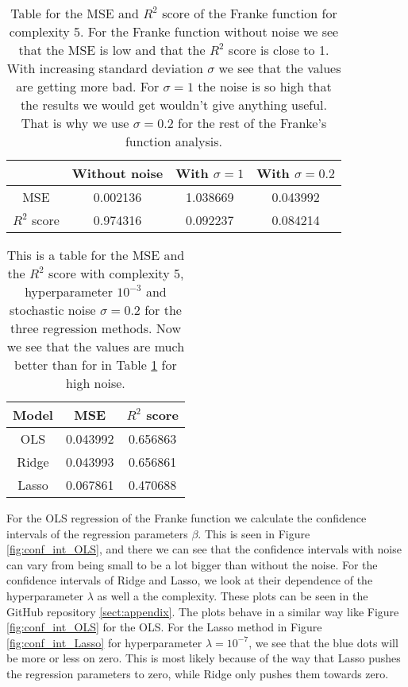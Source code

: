 \documentclass[12pt,a4paper,english]{article}
\begin{document}
\begin{table}[h!]
	\centering
	\begin{tabular}{ |c|c|c|c| }
		\hline \rule{0pt}{13pt}
		 & Without noise & With $\sigma=1$ & With $\sigma=0.2$ \\
		\hline \rule{0pt}{13pt}
		MSE & 0.002136 & 1.038669 & 0.043992 \\
		\hline \rule{0pt}{13pt}
		$R^2$ score & 0.974316 & 0.092237 & 0.084214 \\
		\hline
	\end{tabular}	
	\caption{Table for the MSE and $R^2$ score of the Franke function for complexity 5. For the Franke function without noise we see that the MSE is low and that the $R^2$ score is close to 1. With increasing standard deviation $\sigma$ we see that the values are getting more bad. For $\sigma=1$ the noise is so high that the results we would get wouldn't give anything useful. That is why we use $\sigma=0.2$ for the rest of the Franke's function analysis.}
	\label{tab:high_noise}
\end{table}

\begin{table}[h!]
	\centering
	\begin{tabular}{ |c|c|c| }
		\hline \rule{0pt}{13pt}
		Model& MSE & $R^2$ score \\
		\hline \rule{0pt}{13pt}
		OLS & 0.043992 & 0.656863 \\
		\hline \rule{0pt}{13pt}
		Ridge & 0.043993 & 0.656861 \\
		\hline \rule{0pt}{13pt}
		Lasso & 0.067861 & 0.470688 \\
		\hline
	\end{tabular}	
	\caption{This is a table for the MSE and the $R^2$ score with complexity 5, hyperparameter $10^{-3}$ and stochastic noise $\sigma=0.2$ for the three regression methods. Now we see that the values are much better than for in Table \ref{tab:high_noise} for high noise.}
	\label{tab:low_noise}
\end{table}

For the OLS regression of the Franke function we calculate the confidence intervals of the regression parameters $\beta$. This is seen in Figure \ref{fig:conf_int_OLS}, and there we can see that the confidence intervals with noise can vary from being small to be a lot bigger than without the noise. For the confidence intervals of Ridge and Lasso, we look at their dependence of the hyperparameter $\lambda$ as well a the complexity. These plots can be seen in the GitHub repository \ref{sect:appendix}. The plots behave in a similar way like Figure \ref{fig:conf_int_OLS} for the OLS. For the Lasso method in Figure \ref{fig:conf_int_Lasso} for hyperparameter $\lambda=10^{-7}$, we see that the blue dots will be more or less on zero. This is most likely because of the way that Lasso pushes the regression parameters to zero, while Ridge only pushes them towards zero.
\end{document}
